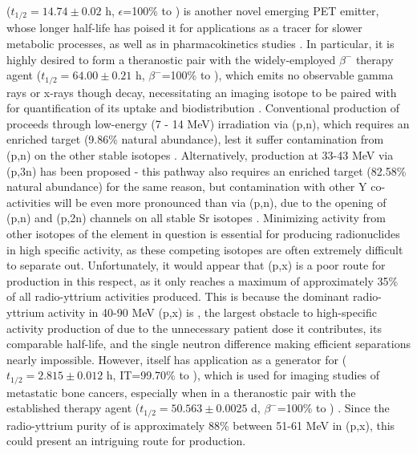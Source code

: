 \documentclass[3p]{elsarticle}
\begin{document}
 ($t_{1/2}=14.74\pm0.02$ h, $\epsilon$=100\% to   \cite{NEGRET20151}) is another novel  emerging  PET emitter, whose longer half-life has poised it for applications as a tracer for slower metabolic processes, as well as in   pharmacokinetics studies \cite{Nickles2003,Qaim2008,QaimSyedM2011}.
In particular, it is highly desired to form a theranostic pair with the widely-employed $\beta^-$ therapy agent  ($t_{1/2}=64.00\pm0.21$ h, $\beta^-$=100\% to  \cite{Browne1997}), which emits no observable gamma rays or x-rays though decay, necessitating an imaging isotope to be paired with for quantification of its uptake and biodistribution  \cite{Herzog1993}.
Conventional production of  proceeds through low-energy (7 - 14 MeV) irradiation via (p,n), which requires an enriched   target (9.86\% natural abundance), lest it suffer contamination from (p,n) on the other stable  isotopes  \cite{Rosch1993}.
Alternatively, production at 33-43 MeV via (p,3n) has been proposed - this pathway also requires an enriched target (82.58\% natural abundance) for the same reason, but contamination with other Y co-activities will be even more pronounced than via (p,n), due to the opening of (p,n) and (p,2n) channels on all stable Sr isotopes \cite{doi:10.1139/v67-193,levkovski1991cross}.
Minimizing activity from other isotopes of the element in question is essential for producing radionuclides in high specific activity, as these competing isotopes are often extremely difficult to separate out.
Unfortunately, it would appear that (p,x) is a poor route for   production in this respect, as it only reaches a maximum of approximately 35\% of all radio-yttrium activities produced.
This is because the dominant radio-yttrium activity in 40-90 MeV (p,x) is  , the largest obstacle to high-specific activity production of   due to the unnecessary patient dose it contributes,  its comparable half-life, and the single neutron difference making efficient separations nearly impossible. 
However,   itself has application as a generator for   ($t_{1/2}=2.815\pm0.012$ h, IT=99.70\% to  \cite{Johnson2015}), which is used for imaging studies of metastatic bone cancers, especially when in a theranostic pair with the established therapy agent  ($t_{1/2}=50.563\pm0.0025$ d, $\beta^-$=100\% to  \cite{Singh2013}) \cite{Kiselev1974,Kandil2009}.
Since the radio-yttrium purity of  is approximately 88\% between 51-61 MeV in (p,x), this could present an intriguing route for   production.
\end{document}
